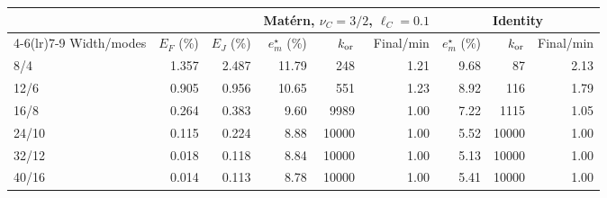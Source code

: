 \begin{tabular}{lrr@{\hspace{10pt}}rrr@{\hspace{10pt}}rrr}
\toprule
 & & & \multicolumn{3}{c}{Mat\'ern, $\nu_C=3/2$, $\ell_C=0.1$} & \multicolumn{3}{c}{Identity} \\
\cmidrule(lr){4-6}\cmidrule(lr){7-9}
Width/modes & $E_F$ (\%) & $E_J$ (\%) & $e_m^\star$ (\%) & $k_{\rm or}$ & Final/min & $e_m^\star$ (\%) & $k_{\rm or}$ & Final/min \\
\midrule
8/4 & 1.357 & 2.487 & 11.79 & 248 & 1.21 & 9.68 & 87 & 2.13 \\
12/6 & 0.905 & 0.956 & 10.65 & 551 & 1.23 & 8.92 & 116 & 1.79 \\
16/8 & 0.264 & 0.383 & 9.60 & 9989 & 1.00 & 7.22 & 1115 & 1.05 \\
24/10 & 0.115 & 0.224 & 8.88 & 10000 & 1.00 & 5.52 & 10000 & 1.00 \\
32/12 & 0.018 & 0.118 & 8.84 & 10000 & 1.00 & 5.13 & 10000 & 1.00 \\
40/16 & 0.014 & 0.113 & 8.78 & 10000 & 1.00 & 5.41 & 10000 & 1.00 \\
\bottomrule
\end{tabular}
